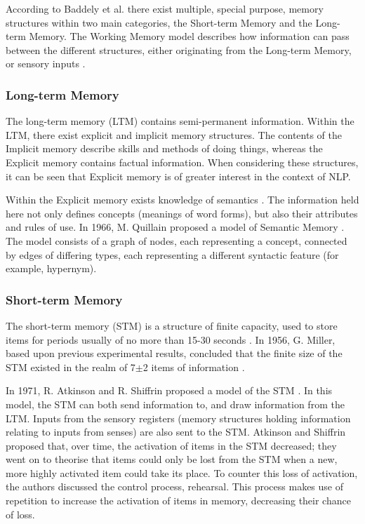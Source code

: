 \documentclass[]{article}
\begin{document}
According to Baddely et al. \cite{MemoryBaddeleyEysenkAnderson} there exist multiple, special purpose, memory structures within two main categories, the Short-term Memory and the Long-term Memory. The Working Memory model describes how information can pass between the different structures, either originating from the Long-term Memory, or sensory inputs \cite{MemoryBaddeleyEysenkAnderson}.

\subsubsection{Long-term Memory}
\label{LongTerm}
The long-term memory (LTM) contains semi-permanent information. Within the LTM, there exist explicit and implicit memory structures. The contents of the Implicit memory describe skills and methods of doing things, whereas the Explicit memory contains factual information\cite{MemoryBaddeleyEysenkAnderson}. When considering these structures, it can be seen that Explicit memory is of greater interest in the context of NLP.

Within the Explicit memory exists knowledge of semantics \cite{MemoryBaddeleyEysenkAnderson}. The information held here not only defines concepts (meanings of word forms), but also their attributes and rules of use. In 1966, M. Quillain proposed a model of Semantic Memory \cite{SemanticMemoryQuillain}. The model consists of a graph of nodes, each representing a concept, connected by edges of differing types, each representing a different syntactic feature (for example, hypernym).  


\subsubsection{Short-term Memory}
\label{ShortTerm}
The short-term memory (STM) is a structure of finite capacity, used to store items for periods usually of no more than 15-30 seconds \cite{MemoryBaddeleyEysenkAnderson}. In 1956, G. Miller, based upon previous experimental results, concluded that the finite size of the STM existed in the realm of 7$\pm$2 items of information \cite{SevenPlusMinusTwo}. 

In 1971, R. Atkinson and R. Shiffrin proposed a model of the STM \cite{ControlProcessesSTMAtkinson}. In this model, the STM can both send information to, and draw information from the LTM. Inputs from the sensory registers (memory structures holding information relating to inputs from senses) are also sent to the STM. Atkinson and Shiffrin proposed that, over time, the activation of items in the STM decreased; they went on to theorise that items could only be lost from the STM when a new, more highly activated item could take its place. To counter this loss of activation, the authors discussed the control process, rehearsal. This process makes use of repetition to increase the activation of items in memory, decreasing their chance of loss. 
\end{document}
